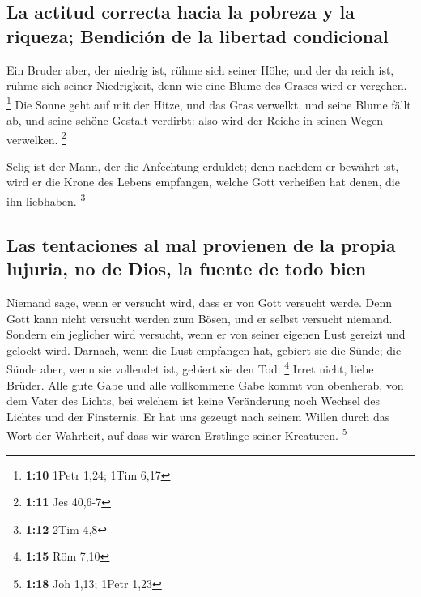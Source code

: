 \hypertarget{la-actitud-correcta-hacia-la-pobreza-y-la-riqueza-bendiciuxf3n-de-la-libertad-condicional}{%
\subsection{La actitud correcta hacia la pobreza y la riqueza; Bendición
de la libertad
condicional}\label{la-actitud-correcta-hacia-la-pobreza-y-la-riqueza-bendiciuxf3n-de-la-libertad-condicional}}

 Ein Bruder aber, der niedrig ist, rühme sich seiner Höhe;
 und der da reich ist, rühme sich seiner Niedrigkeit,
denn wie eine Blume des Grases wird er vergehen. \footnote{\textbf{1:10}
  1Petr 1,24; 1Tim 6,17}  Die Sonne geht auf mit der
Hitze, und das Gras verwelkt, und seine Blume fällt ab, und seine schöne
Gestalt verdirbt: also wird der Reiche in seinen Wegen verwelken.
\footnote{\textbf{1:11} Jes 40,6-7}

 Selig ist der Mann, der die Anfechtung erduldet; denn
nachdem er bewährt ist, wird er die Krone des Lebens empfangen, welche
Gott verheißen hat denen, die ihn liebhaben. \footnote{\textbf{1:12}
  2Tim 4,8}

\hypertarget{las-tentaciones-al-mal-provienen-de-la-propia-lujuria-no-de-dios-la-fuente-de-todo-bien}{%
\subsection{Las tentaciones al mal provienen de la propia lujuria, no de
Dios, la fuente de todo
bien}\label{las-tentaciones-al-mal-provienen-de-la-propia-lujuria-no-de-dios-la-fuente-de-todo-bien}}

 Niemand sage, wenn er versucht wird, dass er von Gott
versucht werde. Denn Gott kann nicht versucht werden zum Bösen, und er
selbst versucht niemand.  Sondern ein jeglicher wird
versucht, wenn er von seiner eigenen Lust gereizt und gelockt wird.
 Darnach, wenn die Lust empfangen hat, gebiert sie die
Sünde; die Sünde aber, wenn sie vollendet ist, gebiert sie den Tod.
\footnote{\textbf{1:15} Röm 7,10}  Irret nicht, liebe
Brüder.  Alle gute Gabe und alle vollkommene Gabe kommt
von obenherab, von dem Vater des Lichts, bei welchem ist keine
Veränderung noch Wechsel des Lichtes und der Finsternis. 
Er hat uns gezeugt nach seinem Willen durch das Wort der Wahrheit, auf
dass wir wären Erstlinge seiner Kreaturen. \footnote{\textbf{1:18} Joh
  1,13; 1Petr 1,23}

